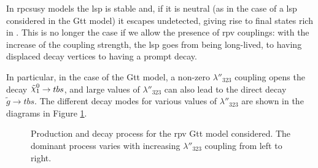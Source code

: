 In \gls{rpcsusy} models the \gls{lsp} is stable and, if it is neutral (as in the case of a \ninoone \gls{lsp} 
considered in the Gtt model) it escapes undetected, giving rise to final states rich in \met. 
This is no longer the case if we allow the presence of \gls{rpv} couplings: with the increase of the 
coupling strength, the \gls{lsp} goes from being long-lived, to having displaced decay vertices to 
having a prompt decay. 

In particular, in the case of the Gtt model, a non-zero $\lambda''_{323}$ coupling opens the decay 
$\ninoone \rightarrow t b s$, and large values  of $\lambda''_{323}$ can also lead to the 
direct decay $\tilde{g} \rightarrow t b s$. The different decay modes for various values of  
$\lambda''_{323}$ are shown in the diagrams in Figure \ref{fig:rpcrpv_diagrams}.
 

\begin{figure}[htbp]
	\centering 
	\caption{Production and decay process for the \gls{rpv} Gtt model considered.
	 The dominant process varies with increasing $\lambda''_{323}$ coupling from left to right.}
	\label{fig:rpcrpv_diagrams}
\end{figure}

